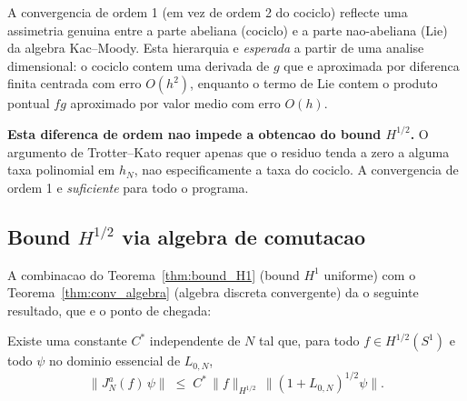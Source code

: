 \begin{remark}\label{rem:ordem}
A convergencia de ordem 1 (em vez de ordem 2 do cociclo) reflecte
uma assimetria genuina entre a parte abeliana (cociclo) e a parte
nao-abeliana (Lie) da algebra Kac--Moody. Esta hierarquia e
\emph{esperada} a partir de uma analise dimensional: o cociclo
contem uma derivada de $g$ que e aproximada por diferenca finita
centrada com erro $O(h^2)$, enquanto o termo de Lie contem o
produto pontual $fg$ aproximado por valor medio com erro $O(h)$.

\textbf{Esta diferenca de ordem nao impede a obtencao do bound
$H^{1/2}$.} O argumento de Trotter--Kato \cite{TL1999, GW1985} requer
apenas que o residuo tenda a zero a alguma taxa polinomial em $h_N$,
nao especificamente a taxa do cociclo. A convergencia de ordem 1
e \emph{suficiente} para todo o programa.
\end{remark}

\subsection{Bound $H^{1/2}$ via algebra de comutacao}

A combinacao do Teorema~\ref{thm:bound_H1} (bound $H^1$ uniforme)
com o Teorema~\ref{thm:conv_algebra} (algebra discreta convergente)
da o seguinte resultado, que e o ponto de chegada:

\begin{theorem}\label{thm:GW_H12}
Existe uma constante $C^*$ independente de $N$ tal que, para todo
$f \in H^{1/2}(S^1)$ e todo $\psi$ no dominio essencial de $L_{0,N}$,
\begin{equation}
  \bigl\|J_N^a(f)\,\psi\bigr\|
  \;\le\; C^*\,\|f\|_{H^{1/2}}\,
  \bigl\|(1 + L_{0,N})^{1/2}\psi\bigr\|.
  \label{eq:bound_H12_final}
\end{equation}
\end{theorem}

